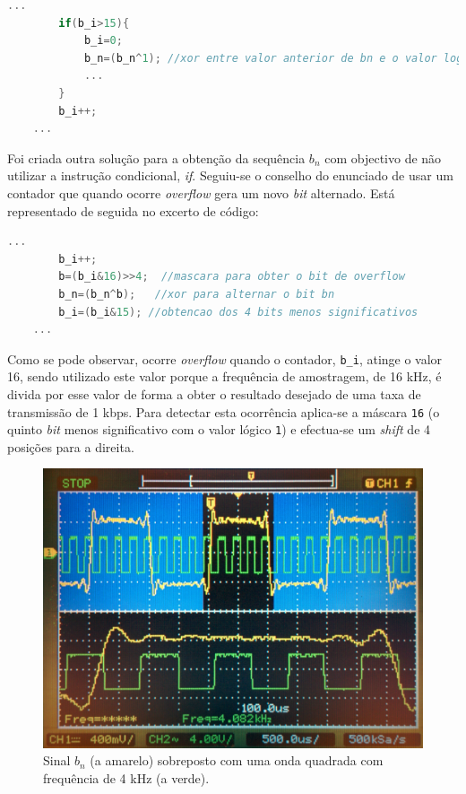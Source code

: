 \documentclass[11pt]{article}
\numberwithin{equation}{section}
\begin{document}
\begin{lstlisting}[language=C]
	...
		if(b_i>15){
			b_i=0;
			b_n=(b_n^1); //xor entre valor anterior de bn e o valor logico 1
			...
		}
		b_i++;
	... 
\end{lstlisting}

Foi criada outra solução para a obtenção da sequência $b_n$ com objectivo de não utilizar a instrução condicional, \textit{if}. Seguiu-se o conselho do enunciado de usar um contador que quando ocorre \textit{overflow} gera um novo \textit{bit} alternado. Está representado de seguida no excerto de código:

\begin{lstlisting}[language=C]
	...
		b_i++;			
		b=(b_i&16)>>4;  //mascara para obter o bit de overflow
		b_n=(b_n^b);   //xor para alternar o bit bn
		b_i=(b_i&15); //obtencao dos 4 bits menos significativos
	...
\end{lstlisting}

Como se pode observar, ocorre \textit{overflow} quando o contador, \texttt{b\_i}, atinge o valor 16, sendo utilizado este valor porque a frequência de amostragem, de 16 kHz, é divida por esse valor de forma a obter o resultado desejado de uma taxa de transmissão de 1 kbps. Para detectar esta ocorrência aplica-se a máscara \texttt{16} (o quinto \textit{bit} menos significativo com o valor lógico \texttt{1}) e efectua-se um \textit{shift} de 4 posições para a direita.

\begin{figure}[H]
	\centering
	\includegraphics[keepaspectratio=true, scale=0.10]{exps/bn_zoom}
	\caption{Sinal $b_n$ (a amarelo) sobreposto com uma onda quadrada com frequência de 4 kHz (a verde).}
	\vspace{-0.8em}
\end{figure} 
\end{document}
